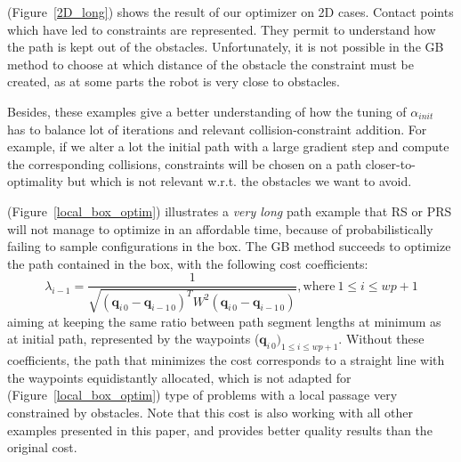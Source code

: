 \documentclass{tADR2e}
\newcommand\conf{\mathbf{q}}
\newcommand\weight{W}
\begin{document}
(Figure~\ref{2D_long}) shows the result of our optimizer on 2D cases. Contact points which have 
led to constraints are represented. They permit to understand how the path is kept out of the obstacles. 
Unfortunately, it is not possible in the GB method to choose at which distance of the obstacle 
the constraint must be created, as at some parts the robot is very close to obstacles.

Besides, these examples give a better understanding of how the tuning of 
$\alpha_{init}$ 
has to balance lot of iterations and relevant collision-constraint addition. For 
example, if we alter a lot the initial path with a large gradient step and 
compute the corresponding collisions, constraints will be chosen on a 
path closer-to-optimality but which is not relevant
w.r.t. the obstacles we want to avoid.

(Figure~\ref{local_box_optim}) illustrates a \textit{very long} path example that RS 
or PRS will not manage to 
optimize in an affordable time, because of probabilistically failing to sample 
configurations in the box. The GB method succeeds to optimize the 
path contained in the box, with the following cost coefficients:
$$
\lambda_{i-1} = \frac{1}{\sqrt{(\conf_{i\,0}-\conf_{i-1\,0})^T \weight^2 
(\conf_{i\,0}-\conf_{i-1\,0})}}, \text{where} \  1\leq i\leq wp+1 
$$
aiming at keeping the same ratio between path segment lengths at 
minimum as at 
initial path, represented by the waypoints ($\conf_{i\,0})_{1\leq i\leq wp+1}$.
Without these coefficients, the path that minimizes the cost corresponds to a 
straight line with the waypoints equidistantly allocated, which is not adapted for 
(Figure~\ref{local_box_optim}) type of problems with a local passage very
constrained by obstacles. Note that this cost is also working with all other 
examples presented in this paper, and provides better quality results than the original cost.
\end{document}
